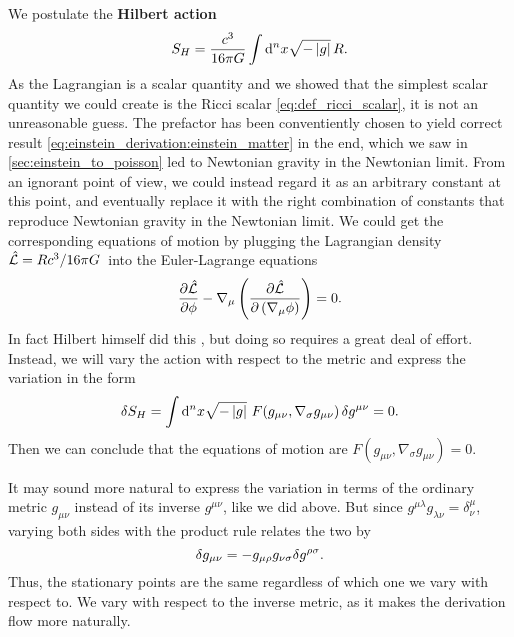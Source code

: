 We postulate the \textbf{Hilbert action}
\begin{equation}
	S_H = \frac{c^3}{16 \pi G} \int \mathop{}\!\mathrm{d}^n x \sqrt{-\left\lvert g \right\rvert} \, R .
	\label{eq:einstein_derivation:hilbert_action}
\end{equation}
As the Lagrangian is a scalar quantity and we showed that the simplest scalar quantity we could create is the Ricci scalar \eqref{eq:def_ricci_scalar}, it is not an unreasonable guess.
The prefactor has been conventiently chosen to yield correct result \eqref{eq:einstein_derivation:einstein_matter} in the end, which we saw in \cref{sec:einstein_to_poisson} led to Newtonian gravity in the Newtonian limit.
From an ignorant point of view, we could instead regard it as an arbitrary constant at this point, and eventually replace it with the right combination of constants that reproduce Newtonian gravity in the Newtonian limit.
We could get the corresponding equations of motion by plugging the Lagrangian density $\hat{\mathcal{L}} = R c^3 / 16 \pi G$ into the Euler-Lagrange equations
\begin{equation}
	\pdv{\hat{\mathcal{L}}}{\phi} - \nabla_\mu \left( \pdv{\hat{\mathcal{L}}}{{\left(\nabla_\mu \phi\right)}} \right) = 0 .
\end{equation}
In fact Hilbert himself did this \cite{ref:hilbert_from_lagrange}, but doing so requires a great deal of effort.
Instead, we will vary the action with respect to the metric and express the variation in the form 
\begin{equation}
	\variation{S_H} = \int \dif^n x \sqrt{-\det{g}} F(g_{\mu \nu}, \nabla_\sigma g_{\mu \nu}) \, \variation{g^{\mu \nu}} = 0 .
	\label{eq:einstein_derivation:action_form}
\end{equation}
Then we can conclude that the equations of motion are $F(g_{\mu \nu}, \nabla_\sigma g_{\mu \nu}) = 0$.

It may sound more natural to express the variation in terms of the ordinary metric $g_{\mu \nu}$ instead of its inverse $g^{\mu \nu}$, like we did above.
But since $g^{\mu \lambda} g_{\lambda \nu} = \delta^\mu_\nu$, varying both sides with the product rule relates the two by
\begin{equation}
	\delta g_{\mu \nu} = -g_{\mu \rho} g_{\nu \sigma} \delta g^{\rho \sigma} .
	\label{eq:einstein_derivation:var_g_ginv}
\end{equation}
Thus, the stationary points are the same regardless of which one we vary with respect to.
We vary with respect to the inverse metric, as it makes the derivation flow more naturally.

